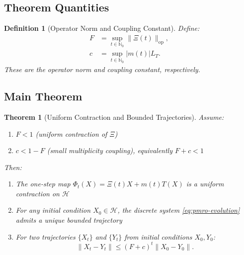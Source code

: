 \documentclass[11pt,a4paper]{article}
\newtheorem{theorem}{Theorem}
\newtheorem{definition}{Definition}
\begin{document}
\subsection{Theorem Quantities}

\begin{definition}[Operator Norm and Coupling Constant]
Define:
\begin{align}
F &= \sup_{t \in \mathbb{N}_0} \|\Xi(t)\|_{\mathrm{op}}, \label{eq:F-def} \\
c &= \sup_{t \in \mathbb{N}_0} |m(t)| L_T. \label{eq:c-def}
\end{align}
These are the \emph{operator norm} and \emph{coupling constant}, respectively.
\end{definition}

\subsection{Main Theorem}

\begin{theorem}[Uniform Contraction and Bounded Trajectories]
\label{thm:main-contraction}
Assume:
\begin{enumerate}
\item \(F < 1\) (uniform contraction of \(\Xi\))
\item \(c < 1 - F\) (small multiplicity coupling), equivalently \(F + c < 1\)
\end{enumerate}
Then:
\begin{enumerate}
\item The one-step map \(\Phi_t(X) = \Xi(t)X + m(t)T(X)\) is a uniform contraction on \(\mathcal{H}\)
\item For any initial condition \(X_0 \in \mathcal{H}\), the discrete system \eqref{eq:pmro-evolution} admits a unique bounded trajectory
\item For two trajectories \(\{X_t\}\) and \(\{Y_t\}\) from initial conditions \(X_0, Y_0\):
\begin{equation}
\|X_t - Y_t\| \leq (F+c)^t \|X_0 - Y_0\|.
\label{eq:geometric-decay}
\end{equation}
\end{enumerate}
\end{theorem}
\end{document}
